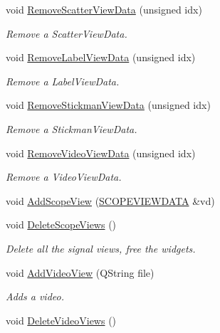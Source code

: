 \begin{CompactItemize}
void \hyperlink{class_main_window_11d2190e49435ba3bcede3603cd2f4f2}{RemoveScatterViewData} (unsigned idx)
\begin{CompactList}\small\item\em Remove a ScatterViewData. \item\end{CompactList}\item 
void \hyperlink{class_main_window_99b5eb2a43ee81015013815f4d316b43}{RemoveLabelViewData} (unsigned idx)
\begin{CompactList}\small\item\em Remove a LabelViewData. \item\end{CompactList}\item 
void \hyperlink{class_main_window_97e67eccc3b0e234cc28061df132bfba}{RemoveStickmanViewData} (unsigned idx)
\begin{CompactList}\small\item\em Remove a StickmanViewData. \item\end{CompactList}\item 
void \hyperlink{class_main_window_6d77b7c5a964ca90883f8fa04ebe41ca}{RemoveVideoViewData} (unsigned idx)
\begin{CompactList}\small\item\em Remove a VideoViewData. \item\end{CompactList}\item 
void \hyperlink{class_main_window_ea626ab95c3904f91e091fe62d900fe6}{AddScopeView} (\hyperlink{class_s_c_o_p_e_v_i_e_w_d_a_t_a}{SCOPEVIEWDATA} \&vd)
\item 
void \hyperlink{class_main_window_893768508cc5cac2bbd01135ff53a23c}{DeleteScopeViews} ()
\begin{CompactList}\small\item\em Delete all the signal views, free the widgets. \item\end{CompactList}\item 
void \hyperlink{class_main_window_9eadd6d41f096191266165ed8544d966}{AddVideoView} (QString file)
\begin{CompactList}\small\item\em Adds a video. \item\end{CompactList}\item 
void \hyperlink{class_main_window_2bf9d66369a40ff29079f0f0e3f70f4f}{DeleteVideoViews} ()

\end{CompactItemize}
